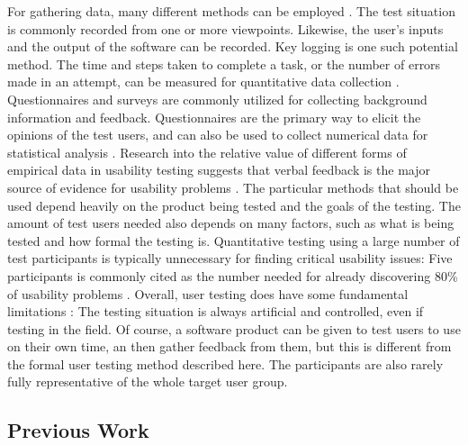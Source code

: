 \documentclass[english, 12pt, a4paper, pdftex, elec, utf8]{aaltothesis}
\begin{document}
For gathering data, many different methods can be employed \cite{rubin2008handbook, ebling2000contributions}. The test situation is commonly recorded from one or more viewpoints. Likewise, the user's inputs and the output of the software can be recorded. Key logging is one such potential method. The time and steps taken to complete a task, or the number of errors made in an attempt, can be measured for quantitative data collection \cite{ebling2000contributions}. Questionnaires and surveys are commonly utilized for collecting background information and feedback. Questionnaires are the primary way to elicit the opinions of the test users, and can also be used to collect numerical data for statistical analysis \cite{rubin2008handbook}. Research into the relative value of different forms of empirical data in usability testing suggests that verbal feedback is the major source of evidence for usability problems \cite{ebling2000contributions}. The particular methods that should be used depend heavily on the product being tested and the goals of the testing. The amount of test users needed also depends on many factors, such as what is being tested and how formal the testing is. Quantitative testing using a large number of test participants is typically unnecessary for finding critical usability issues: Five participants is commonly cited as the number needed for already discovering 80\% of usability problems \cite{rubin2008handbook, riihiaho2015}. Overall, user testing does have some fundamental limitations \cite[p.~26]{rubin2008handbook}: The testing situation is always artificial and controlled, even if testing in the field. Of course, a software product can be given to test users to use on their own time, an then gather feedback from them, but this is different from the formal user testing method described here. The participants are also rarely fully representative of the whole target user group.

\subsection{Previous Work} \label{subsec:work}
\end{document}
